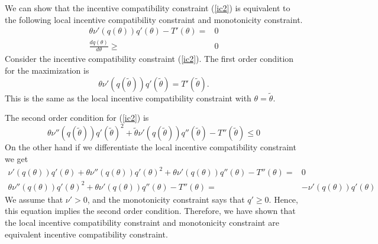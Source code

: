 \documentclass[12pt,reqno]{amsart}
\theoremstyle{definition}
\begin{document}
We can show that the incentive compatibility constraint (\ref{ic2}) is
equivalent to the following local incentive 
compatibility constraint and monotonicity constraint.
\begin{align}
  \theta \nu'(q(\theta))q'(\theta) - T'(\theta) = & 0 \label{lic} \\
  \frac{dq(\theta)}{d\theta} \geq & 0 \label{mon}
\end{align}
Consider the incentive compatibility constraint
(\ref{ic2}). The first order condition for the maximization is
\[ \theta \nu'(q(\tilde{\theta})) q'(\tilde{\theta}) =
T'(\tilde{\theta}). \]
This is the same as the local incentive compatibility constraint with
$\theta = \tilde{\theta}$.

The second order condition for (\ref{ic2}) is 
\[ \theta \nu''(q(\tilde{\theta}))q'(\tilde{\theta})^2 +
\tilde{\theta} \nu'(q(\tilde{\theta})) q''(\tilde{\theta}) -
T''(\tilde{\theta}) \leq 0 \]   
On the other hand if we differentiate the local incentive
compatibility constraint we get 
\begin{align*}
  \nu'(q(\theta))q'(\theta) + \theta \nu''(q(\theta)) q'(\theta)^2 + \theta
  \nu'(q(\theta)) q''(\theta) - T''(\theta) = & 0 \\
  \theta \nu''(q(\theta)) q'(\theta)^2 + \theta
  \nu'(q(\theta)) q''(\theta) - T''(\theta) = & -\nu'(q(\theta))q'(\theta)  
\end{align*}
We assume that $\nu'>0$, and the monotonicity constraint says that
$q'\geq 0$. Hence, this equation implies the second order
condition. Therefore, we have shown that the local incentive
compatibility constraint and monotonicity constraint are equivalent
incentive compatibility constraint.
\end{document}

